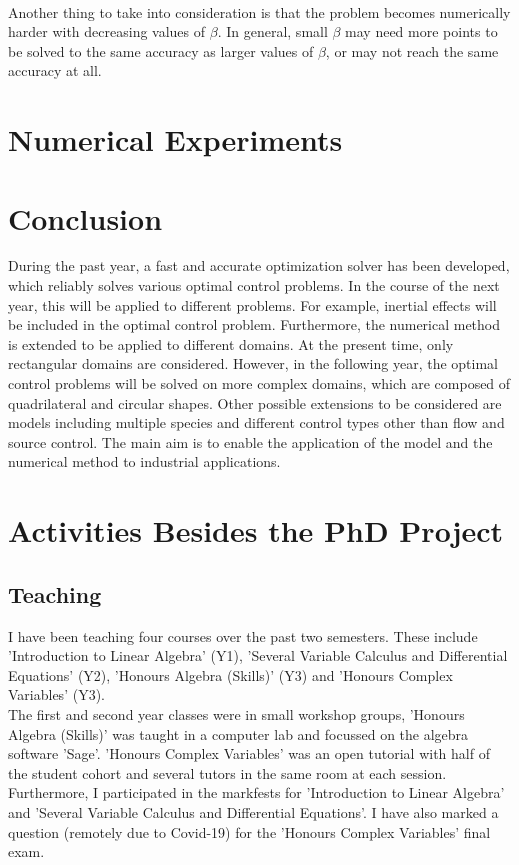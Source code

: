 \documentclass[11pt, a4paper]{article}
\theoremstyle{definition}
\begin{document}
\\
Another thing to take into consideration is that the problem becomes numerically harder with decreasing values of $\beta$. In general, small $\beta$ may need more points to be solved to the same accuracy as larger values of $\beta$, or may not reach the same accuracy at all. 


\section{Numerical Experiments} \label{sec:Examples}



\section{Conclusion}
During the past year, a fast and accurate optimization solver has been developed, which reliably solves various optimal control problems. In the course of the next year, this will be applied to different problems. For example, inertial effects will be included in the optimal control problem. Furthermore, the numerical method is extended to be applied to different domains. At the present time, only rectangular domains are considered. However, in the following year, the optimal control problems will be solved on more complex domains, which are composed of quadrilateral and circular shapes. 
Other possible extensions to be considered are models including multiple species and different control types other than flow and source control.
The main aim is to enable the application of the model and the numerical method to industrial applications.


\pagebreak	



\pagebreak
\appendix

\section{Activities Besides the PhD Project}
\subsection{Teaching}
I have been teaching four courses over the past two semesters. These include 'Introduction to Linear Algebra' (Y1), 'Several Variable Calculus and Differential Equations' (Y2), 'Honours Algebra (Skills)' (Y3) and 'Honours Complex Variables' (Y3).\\
The first and second year classes were in small workshop groups, 'Honours Algebra (Skills)' was taught in a computer lab and focussed on the algebra software 'Sage'. 'Honours Complex Variables' was an open tutorial with half of the student cohort and several tutors in the same room at each session.\\
Furthermore, I participated in the markfests for 'Introduction to Linear Algebra' and 'Several Variable Calculus and Differential Equations'. I have also marked a question (remotely due to Covid-19) for the 'Honours Complex Variables' final exam.
\end{document}
